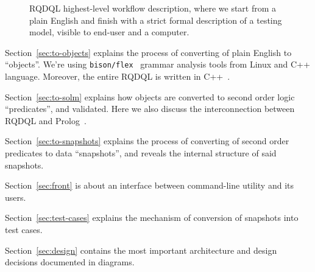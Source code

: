 \documentclass{article}
\begin{document}
    \begin{figure}[ht]
        \caption{RQDQL highest-level workflow description, where we start
            from a plain English and finish with a strict formal description
            of a testing model, visible to end-user and a computer.}
        \label{fig:Workflow}
    \end{figure}
    
    Section~\ref{sec:to-objects} explains the process of converting of plain English
    to ``objects''. We're using \texttt{bison/flex}~\cite{yacc} grammar analysis
    tools from Linux and C++ language. 
    Moreover, the entire RQDQL is written in C++~\cite{stroustrup00}.
    
    Section~\ref{sec:to-solm} explains how objects are converted to 
    second order logic ``predicates'',
    and validated. Here we also discuss the interconnection between
    RQDQL and Prolog~\cite{shapiro94}.
    
    Section~\ref{sec:to-snapshots} explains the process of converting of 
    second order predicates to data ``snapshots'', and reveals the internal
    structure of said snapshots.

    Section~\ref{sec:front} is about an interface between 
    command-line utility and its users.
    
    Section~\ref{sec:test-cases} explains the mechanism of conversion
    of snapshots into test cases.
    
    Section~\ref{sec:design} contains the most important architecture
    and design decisions documented in diagrams.
\end{document}
